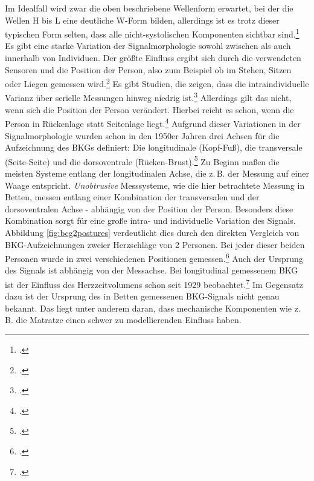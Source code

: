 	Im Idealfall wird zwar die oben beschriebene Wellenform erwartet, bei der die Wellen H bis L eine deutliche W-Form bilden, allerdings ist es trotz dieser typischen Form selten, dass alle nicht-systolischen Komponenten sichtbar sind.\footcite[Vgl.][]{Pinheiro2010} Es gibt eine starke Variation der Signalmorphologie sowohl zwischen als auch innerhalb von Individuen. Der größte Einfluss ergibt sich durch die verwendeten Sensoren und die Position der Person, also zum Beispiel ob im Stehen, Sitzen oder Liegen gemessen wird.\footcite[Vgl.][]{Sadek2019} Es gibt Studien, die zeigen, dass die intraindividuelle Varianz über serielle Messungen hinweg niedrig ist.\footcite[Vgl.][]{Inan2015} Allerdings gilt das nicht, wenn sich die Position der Person verändert. Hierbei reicht es schon, wenn die Person in Rückenlage statt Seitenlage liegt.\footcite[Vgl.][]{Bruser2011} Aufgrund dieser Variationen in der Signalmorphologie wurden schon in den 1950er Jahren drei Achsen für die Aufzeichnung des \ac{BKG}s definiert: Die longitudinale (Kopf-Fuß), die transversale (Seite-Seite) und die dorsoventrale (Rücken-Brust).\footcite[][Vgl.]{Bruser2011, Inan2015} Zu Beginn maßen die meisten Systeme entlang der longitudinalen Achse, die z.\,B. der Messung auf einer Waage entspricht. \textit{Unobtrusive} Messsysteme, wie die hier betrachtete Messung in Betten, messen entlang einer Kombination der transversalen und der dorsoventralen Achse - abhängig von der Position der Person. Besonders diese Kombination sorgt für eine große intra- und individuelle Variation des Signals. Abbildung \ref{fig:bcg2postures} verdeutlicht dies durch den direkten Vergleich von \ac{BKG}-Aufzeichnungen zweier Herzschläge von 2 Personen. Bei jeder dieser beiden Personen wurde in zwei verschiedenen Positionen gemessen.\footcite{Bruser2011} Auch der Ursprung des Signals ist abhängig von der Messachse. Bei longitudinal gemessenem \ac{BKG} ist der Einfluss des Herzzeitvolumens schon seit 1929 beobachtet.\footcite[Vgl.][]{Starr1939} Im Gegensatz dazu ist der Ursprung des in Betten gemessenen \ac{BKG}-Signals nicht genau bekannt. Das liegt unter anderem daran, dass mechanische Komponenten wie z.\,B. die Matratze einen schwer zu modellierenden Einfluss haben.
	
